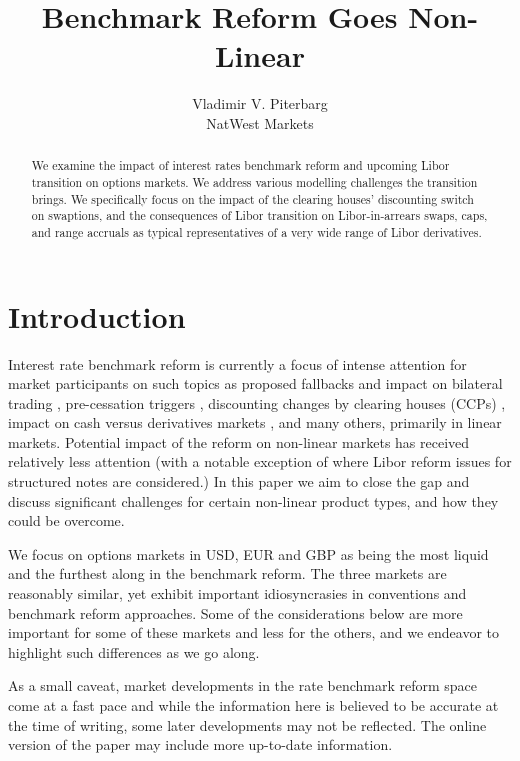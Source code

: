 \documentclass{article}
\begin{document}
\title{Benchmark Reform Goes Non-Linear}
\author{Vladimir V. Piterbarg \\
NatWest Markets}
\maketitle

\begin{abstract}
We examine the impact of interest rates benchmark reform and upcoming Libor
transition on options markets. We address various modelling challenges the
transition brings. We specifically focus on the impact of the clearing
houses' discounting switch on swaptions, and the consequences of Libor
transition on Libor-in-arrears swaps, caps, and range accruals as typical
representatives of a very wide range of Libor derivatives.
\end{abstract}

\section{Introduction}

Interest rate benchmark reform is currently a focus of intense attention for
market participants on such topics as proposed fallbacks and impact on
bilateral trading \cite{risk-mh1}, pre-cessation triggers \cite{risk-presess}%
, discounting changes by clearing houses (CCPs) \cite{risk-swpt}, impact on
cash versus derivatives markets \cite{risk-bonds}, and many others,
primarily in linear markets. Potential impact of the reform on non-linear
markets has received relatively less attention (with a notable exception of 
\cite{po-vp} where Libor reform issues for structured notes are considered.)
In this paper we aim to close the gap and discuss significant challenges for
certain non-linear product types, and how they could be overcome. 

We focus on options markets in USD, EUR and GBP as being the most liquid and
the furthest along in the benchmark reform. The three markets are reasonably
similar, yet exhibit important idiosyncrasies in conventions and benchmark
reform approaches. Some of the considerations below are more important for
some of these markets and less for the others, and we endeavor to highlight
such differences as we go along.

As a small caveat, market developments in the rate benchmark reform space
come at a fast pace and while the information here is believed to be
accurate at the time of writing, some later developments may not be
reflected. The online version of the paper \cite{vp-br} may include more
up-to-date information.
\end{document}
